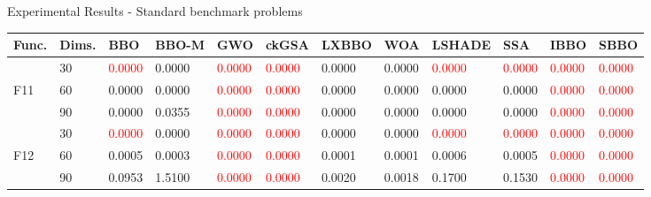 \documentclass [9pt,times] {beamer}
\begin{document}
  \begin{frame}[plain]{Experimental Results - Standard benchmark problems}
      
        \begin{center}
       \fontsize{4.3pt}{7.3pt}\selectfont
\begin{tabular}{p{0.08in} | p{0.09in} | p{0.25in} |  p{0.23in} |  p{0.25in}|  p{0.25in} |  p{0.25in} | p{0.25in} |  p{0.25in} | p{0.25in} |  p{0.25in} |  p{0.25in}}
    \hline
\hline\textbf{Func.} 	&	 \textbf{Dims.} 	&	 \textbf{BBO} 	&	 \textbf{BBO-M} &	 \textbf{GWO} 	&	 \textbf{ckGSA} 	&	 \textbf{LXBBO} 	&	 \textbf{WOA} 	&	\textbf{LSHADE} 	&	 \textbf{SSA} 	&	 \textbf{IBBO} 	&	\textbf{SBBO} \\
\hline
\hline																							
	&	30	&\textcolor{red}{	0.0000	}&	0.0000	&\textcolor{red}{	0.0000	}&\textcolor{red}{	0.0000	}&	0.0000	&	0.0000	&\textcolor{red}{	0.0000	}&\textcolor{red}{	0.0000	}&\textcolor{red}{	0.0000	}&\textcolor{red}{	0.0000	}\\
F11	&	60	&	0.0000	&	0.0000	&\textcolor{red}{	0.0000	}&\textcolor{red}{	0.0000	}&	0.0000	&	0.0000	&	0.0000	&	0.0000	&\textcolor{red}{	0.0000	}&\textcolor{red}{	0.0000	}\\
	&	90	&	0.0000	&	0.0355	&\textcolor{red}{	0.0000	}&\textcolor{red}{	0.0000	}&	0.0000	&	0.0000	&	0.0000	&	0.0000	&\textcolor{red}{	0.0000	}&\textcolor{red}{	0.0000	}\\
\hline																							
	&	30	&\textcolor{red}{	0.0000	}&	0.0000	&\textcolor{red}{	0.0000	}&\textcolor{red}{	0.0000	}&	0.0000	&	0.0000	&\textcolor{red}{	0.0000	}&\textcolor{red}{	0.0000	}&\textcolor{red}{	0.0000	}&\textcolor{red}{	0.0000	}\\
F12	&	60	&	0.0005	&	0.0003	&\textcolor{red}{	0.0000	}&\textcolor{red}{	0.0000	}&	0.0001	&	0.0001	&	0.0006	&	0.0005	&\textcolor{red}{	0.0000	}&\textcolor{red}{	0.0000	}\\
	&	90	&	0.0953	&	1.5100	&\textcolor{red}{	0.0000	}&\textcolor{red}{	0.0000	}&	0.0020	&	0.0018	&	0.1700	&	0.1530	&\textcolor{red}{	0.0000	}&\textcolor{red}{	0.0000	}\\


\end{tabular}
\end{center}
\end{frame}
\end{document}
